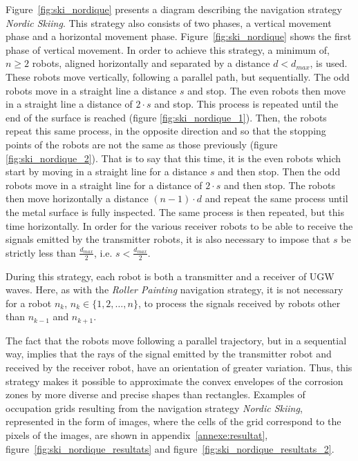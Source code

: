 \documentclass[english,RandD]{rapportPFE}  %
\begin{document}
				Figure~\ref{fig:ski_nordique} presents a diagram describing the navigation strategy \textit{Nordic Skiing}.
				This strategy also consists of two phases, a vertical movement phase and a horizontal movement phase.
				Figure~\ref{fig:ski_nordique} shows the first phase of vertical movement.
				In order to achieve this strategy, a minimum of, $n \ge 2$ robots, aligned horizontally and separated by a distance $d < d_{max}$, is used.
				These robots move vertically, following a parallel path, but sequentially.
				The odd robots move in a straight line a distance $s$ and stop.
				The even robots then move in a straight line a distance of $2 \cdot s$ and stop.
				This process is repeated until the end of the surface is reached (figure \ref{fig:ski_nordique_1}).
				Then, the robots repeat this same process, in the opposite direction and so that the stopping points of the robots are not the same as those previously (figure \ref{fig:ski_nordique_2}).
				That is to say that this time, it is the even robots which start by moving in a straight line for a distance $s$ and then stop.
				Then the odd robots move in a straight line for a distance of $2 \cdot s$ and then stop.
				The robots then move horizontally a distance $(n - 1) \cdot d$ and repeat the same process until the metal surface is fully inspected.
				The same process is then repeated, but this time horizontally.
				In order for the various receiver robots to be able to receive the signals emitted by the transmitter robots, it is also necessary to impose that $s$ be strictly less than $\frac{d_{max}}{2}$, i.e. $s < \frac{d_ {max}}{2}$.

				During this strategy, each robot is both a transmitter and a receiver of UGW waves.
				Here, as with the \textit{Roller Painting} navigation strategy, it is not necessary for a robot $n_k$, $n_k \in \{1, 2, \dots, n\}$, to process the signals received by robots other than $n_{k-1}$ and $n_{k+1}$.

				The fact that the robots move following a parallel trajectory, but in a sequential way, implies that the rays of the signal emitted by the transmitter robot and received by the receiver robot, have an orientation of greater variation.
				Thus, this strategy makes it possible to approximate the convex envelopes of the corrosion zones by more diverse and precise shapes than rectangles.
				Examples of occupation grids resulting from the navigation strategy \textit{Nordic Skiing}, represented in the form of images, where the cells of the grid correspond to the pixels of the images, are shown in appendix~\ref{annexe:resultat}, figure~\ref{fig:ski_nordique_resultats} and figure~\ref{fig:ski_nordique_resultats_2}.
\end{document}
